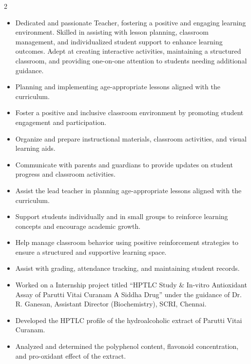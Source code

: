 \documentclass[10pt,a4paper,ragged2e,withhyper]{altacv}
\begin{document}
\begin{paracol}{2}
  \begin{itemize}
   \item Dedicated and passionate Teacher,  fostering a positive and engaging learning environment. Skilled in assisting with lesson planning, classroom management, and individualized student support to enhance learning outcomes. Adept at creating interactive activities, maintaining a structured classroom, and providing one-on-one attention to students needing additional guidance.  \end{itemize}


\divider


\begin{itemize}
\item Planning and implementing age-appropriate lessons aligned with the curriculum.
\item Foster a positive and inclusive classroom environment by promoting student engagement and participation.
\item Organize and prepare instructional materials, classroom activities, and visual learning aids.
\item Communicate with parents and guardians to provide updates on student progress and classroom activities.
  \end{itemize}

\divider

\begin{itemize}
\item Assist the lead teacher in planning age-appropriate lessons aligned with the curriculum.
\item Support students individually and in small groups to reinforce learning concepts and encourage academic growth.
\item Help manage classroom behavior using positive reinforcement strategies to ensure a structured and supportive learning space.
\item Assist with grading, attendance tracking, and maintaining student records.
\end{itemize}


\begin{itemize}
\item Worked on a Internship project titled “HPTLC Study \& In-vitro Antioxidant Assay of \‘Parutti Vitai Curanam\’ \– A Siddha Drug” under the guidance of Dr. R. Ganesan, Assistant Director (Biochemistry), SCRI, Chennai.
\item Developed the HPTLC profile of the hydroalcoholic extract of Parutti Vitai Curanam.
\item Analyzed and determined the polyphenol content, flavonoid concentration, and pro-oxidant effect of the extract.
\end{itemize}


\end{paracol}
\end{document}
